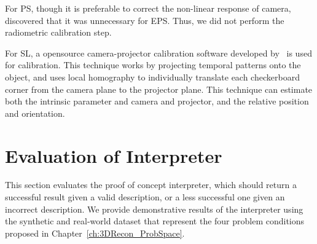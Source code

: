 For PS, though it is preferable to correct the non-linear response of camera,~\citeauthor{hertzmann2005example} discovered that it was unnecessary for EPS. Thus, we did not perform the radiometric calibration step.

For SL, a opensource camera-projector calibration software developed by~\citeauthor{moreno2012simple} is used for calibration. This technique works by projecting temporal patterns onto the object, and uses local homography to individually translate each checkerboard corner from the camera plane to the projector plane. This technique can estimate both the intrinsic parameter and camera and projector, and the relative position and orientation.

\section{Evaluation of Interpreter}
\label{sec:eval_interp}
This section evaluates the proof of concept interpreter, which should return a successful result given a valid description, or a less successful one given an incorrect description. We provide demonstrative results of the interpreter using the synthetic and real-world dataset that represent the four problem conditions proposed in Chapter~\ref{ch:3DRecon_ProbSpace}.

